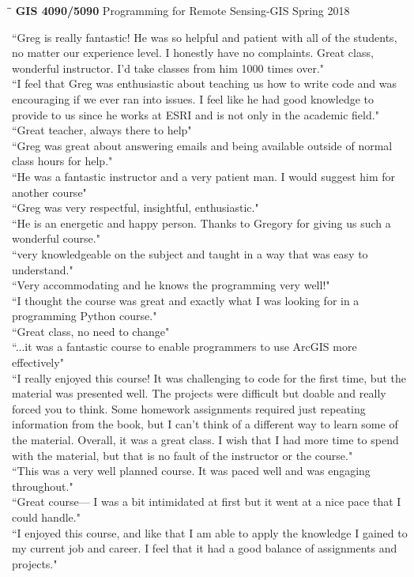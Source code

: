 \documentclass{res}
\begin{document}
\begin{resume}
\begin{tabbing}
	\hspace{2.3in}\= \hspace{2.6in}\= \kill %
	{\bf GIS 4090/5090} \>Programming for Remote Sensing-GIS     \>Spring 2018\\
	\>
\end{tabbing}\vspace{-20pt}      %
``Greg is really fantastic! He was so helpful and patient with all of the students, no matter our experience level. I honestly have no complaints. Great class, wonderful instructor. I'd take classes from him 1000 times over."\\
``I feel that Greg was enthusiastic about teaching us how to write code and was encouraging if we ever ran into issues. I feel like he had good knowledge to provide to us since he works at ESRI and is not only in the academic field."\\
``Great teacher, always there to help"\\
``Greg was great about answering emails and being available outside of normal class hours for help."\\
``He was a fantastic instructor and a very patient man. I would suggest him for another course"\\
``Greg was very respectful, insightful, enthusiastic."\\
``He is an energetic and happy person. Thanks to Gregory for giving us such a wonderful course."\\
``very knowledgeable on the subject and taught in a way that was easy to understand."\\
``Very accommodating and he knows the programming very well!"\\
``I thought the course was great and exactly what I was looking for in a programming Python course."\\
``Great class, no need to change"\\
``...it was a fantastic course to enable programmers to use ArcGIS more effectively"\\
``I really enjoyed this course! It was challenging to code for the first time, but the material was presented well. The projects were difficult but doable and really forced you to think. Some homework assignments required just repeating information from the book, but I can't think of a different way to learn some of the material. Overall, it was a great class. I wish that I had more time to spend with the material, but that is no fault of the instructor or the course."\\
``This was a very well planned course. It was paced well and was engaging throughout."\\
``Great course–– I was a bit intimidated at first but it went at a nice pace that I could handle."\\
``I enjoyed this course, and like that I am able to apply the knowledge I gained to my current job and career. I feel that it had a good balance of assignments and projects."\\


\end{resume}
\end{document}
